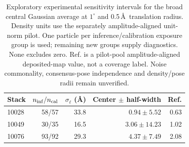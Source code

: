 \begin{table}[t]
\centering\small
\begin{tabular}{lrrrr}
\toprule
Stack & $n_{\rm inf}/n_{\rm cal}$ & $\sigma_\ell$ (\AA) & Center $\pm$ half-width & Ref.\\
\midrule
10028 & 58/57 & 33.8 & $0.94\pm5.52$ & 0.63\\
10049 & 30/35 & 16.5 & $3.06\pm14.23$ & 1.02\\
10076 & 93/92 & 29.3 & $4.37\pm7.49$ & 2.08\\
\bottomrule
\end{tabular}
\caption{Exploratory experimental sensitivity intervals for the broad central Gaussian average at $1^\circ$ and 0.5\,\AA\ translation radius. Density units use the separately amplitude-aligned unit-norm pilot. One particle per inference/calibration exposure group is used; remaining new groups supply diagnostics. None excludes zero. Ref. is a pilot-pool amplitude-aligned deposited-map value, not a coverage label. Noise commonality, consensus-pose independence and density/pose radii remain unverified.}
\label{tab:revisionexperimental}
\end{table}
